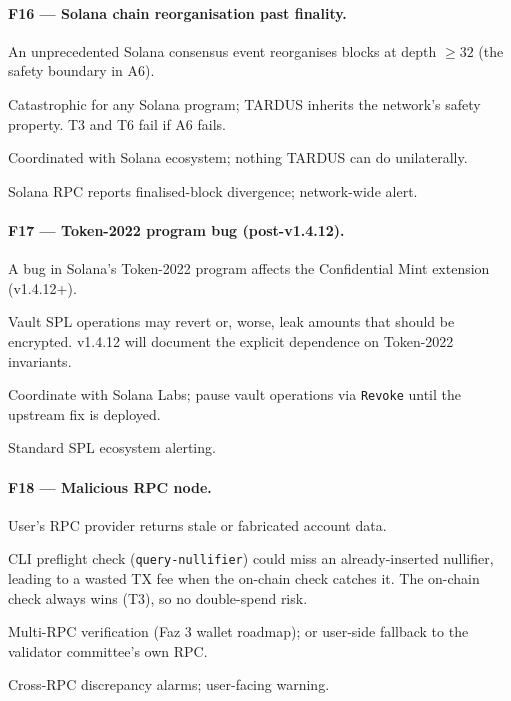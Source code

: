 \paragraph{F16 --- Solana chain reorganisation past finality.}
\begin{description}[leftmargin=2em,style=nextline,itemsep=0pt]
  \item[Trigger] An unprecedented Solana consensus event reorganises
    blocks at depth $\geq 32$ (the safety boundary in A6).
  \item[Consequence] Catastrophic for any Solana program; TARDUS
    inherits the network's safety property. T3 and T6 fail if A6
    fails.
  \item[Recovery] Coordinated with Solana ecosystem; nothing TARDUS
    can do unilaterally.
  \item[Detection] Solana RPC reports finalised-block divergence;
    network-wide alert.
\end{description}

\paragraph{F17 --- Token-2022 program bug (post-v1.4.12).}
\begin{description}[leftmargin=2em,style=nextline,itemsep=0pt]
  \item[Trigger] A bug in Solana's Token-2022 program affects the
    Confidential Mint extension (v1.4.12+).
  \item[Consequence] Vault SPL operations may revert or, worse, leak
    amounts that should be encrypted. v1.4.12 will document the
    explicit dependence on Token-2022 invariants.
  \item[Recovery] Coordinate with Solana Labs; pause vault operations
    via \texttt{Revoke} until the upstream fix is deployed.
  \item[Detection] Standard SPL ecosystem alerting.
\end{description}

\paragraph{F18 --- Malicious RPC node.}
\begin{description}[leftmargin=2em,style=nextline,itemsep=0pt]
  \item[Trigger] User's RPC provider returns stale or fabricated
    account data.
  \item[Consequence] CLI preflight check (\texttt{query-nullifier})
    could miss an already-inserted nullifier, leading to a wasted
    TX fee when the on-chain check catches it. The on-chain check
    always wins (T3), so no double-spend risk.
  \item[Recovery] Multi-RPC verification (Faz 3 wallet roadmap); or
    user-side fallback to the validator committee's own RPC.
  \item[Detection] Cross-RPC discrepancy alarms; user-facing warning.
\end{description}

